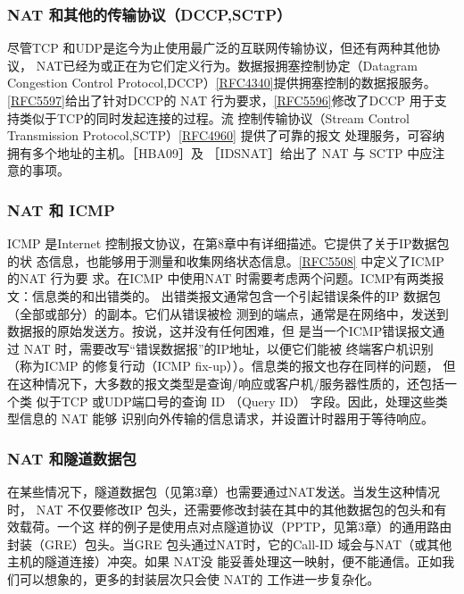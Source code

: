 \subsubsection{NAT 和其他的传输协议（DCCP,SCTP）}

尽管TCP 和UDP是迄今为止使用最广泛的互联网传输协议，但还有两种其他协议，
NAT已经为或正在为它们定义行为。数据报拥塞控制协定（Datagram Congestion Control
Protocol,DCCP）\href{https://www.rfc-editor.org/rfc/rfc4340}{[RFC4340]}提供拥塞控制的数据报服务。\href{https://www.rfc-editor.org/rfc/rfc5597}{[RFC5597]}给出了针对DCCP的
NAT 行为要求，\href{https://www.rfc-editor.org/rfc/rfc5596}{[RFC5596]}修改了DCCP 用于支持类似于TCP的同时发起连接的过程。流
控制传输协议（Stream Control Transmission Protocol,SCTP）\href{https://www.rfc-editor.org/rfc/rfc4960}{[RFC4960]} 提供了可靠的报文
处理服务，可容纳拥有多个地址的主机。［HBA09］及 ［IDSNAT］给出了 NAT 与 SCTP 中应注
意的事项。

\subsubsection{NAT 和 ICMP}

ICMP 是Internet 控制报文协议，在第8章中有详细描述。它提供了关于IP数据包的状
态信息，也能够用于测量和收集网络状态信息。\href{https://www.rfc-editor.org/rfc/rfc5508}{[RFC5508]} 中定义了ICMP 的NAT 行为要
求。在ICMP 中使用NAT 时需要考虑两个问题。ICMP有两类报文：信息类的和出错类的。
出错类报文通常包含一个引起错误条件的IP 数据包（全部或部分）的副本。它们从错误被检
测到的端点，通常是在网络中，发送到数据报的原始发送方。按说，这并没有任何困难，但
是当一个ICMP错误报文通过 NAT 时，需要改写“错误数据报”的IP地址，以便它们能被
终端客户机识别（称为ICMP 的修复行动（ICMP fix-up））。信息类的报文也存在同样的问题，
但在这种情况下，大多数的报文类型是查询/响应或客户机/服务器性质的，还包括一个类
似于TCP 或UDP端口号的查询 ID （Query ID） 字段。因此，处理这些类型信息的 NAT 能够
识别向外传输的信息请求，并设置计时器用于等待响应。

\subsubsection{NAT 和隧道数据包}

在某些情况下，隧道数据包（见第3章）也需要通过NAT发送。当发生这种情况时，
NAT 不仅要修改IP 包头，还需要修改封装在其中的其他数据包的包头和有效载荷。一个这
样的例子是使用点对点隧道协议（PPTP，见第3章）的通用路由封装（GRE）包头。当GRE
包头通过NAT时，它的Call-ID 域会与NAT（或其他主机的隧道连接）冲突。如果 NAT没
能妥善处理这一映射，便不能通信。正如我们可以想象的，更多的封装层次只会使 NAT的
工作进一步复杂化。

